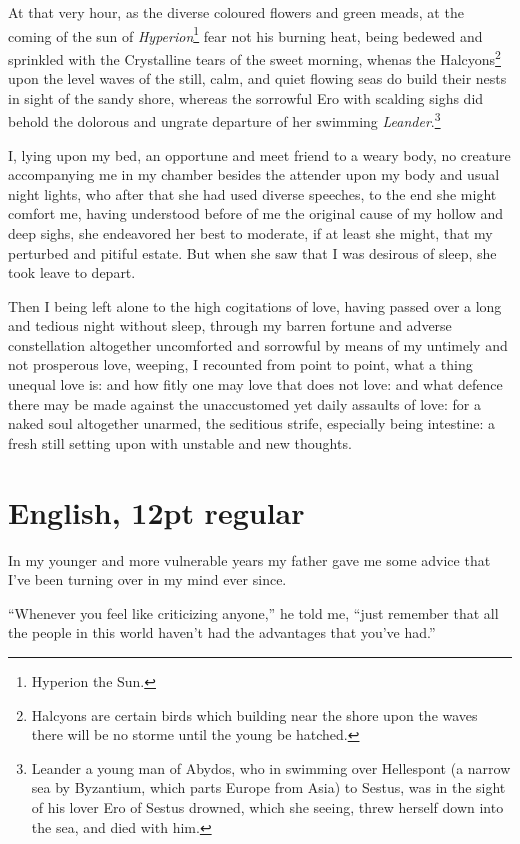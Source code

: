 \documentclass[12pt]{book}
\begin{document}
At that very hour, as the diverse coloured flowers and green meads,
at the coming of the sun of \textit{Hyperion}\footnote{Hyperion the Sun.}
fear not his burning heat, being bedewed and sprinkled with the
Crystalline tears of the sweet morning, whenas the
Halcyons\footnote{Halcyons are certain birds which building near the
  shore upon the waves there will be no storme until the young be
  hatched.} upon the level waves of the still, calm, and quiet
flowing seas do build their nests in sight of the sandy shore,
whereas the sorrowful Ero with scalding sighs did behold the
dolorous and ungrate departure of her swimming
\textit{Leander}.\footnote{Leander a young man of Abydos, who in swimming over
  Hellespont (a narrow sea by Byzantium, which parts Europe from Asia)
  to Sestus, was in the sight of his lover Ero of Sestus drowned,
  which she seeing, threw herself down into the sea, and died with
  him.}

I, lying upon my bed, an opportune and meet friend to a weary body, no
creature accompanying me in my chamber besides the attender upon my
body and usual night lights, who after that she had used diverse
speeches, to the end she might comfort me, having understood before
of me the original cause of my hollow and deep sighs, she
endeavored her best to moderate, if at least she might, that my
perturbed and pitiful estate. But when she saw that I was desirous
of sleep, she took leave to depart.

Then I being left alone to the high cogitations of love, having passed
over a long and tedious night without sleep, through my barren
fortune and adverse constellation altogether uncomforted and
sorrowful by means of my untimely and not prosperous love, weeping,
I recounted from point to point, what a thing unequal love is: and
how fitly one may love that does not love: and what defence there may
be made against the unaccustomed yet daily assaults of love: for a
naked soul altogether unarmed, the seditious strife, especially being
intestine: a fresh still setting upon with unstable and new
thoughts.\pagebreak

\section*{English, 12pt regular}

In my younger and more vulnerable years my father gave me some advice
that I’ve been turning over in my mind ever since.

“Whenever you feel like criticizing anyone,” he told me, “just
remember that all the people in this world haven’t had the advantages
that you’ve had.”
\end{document}
